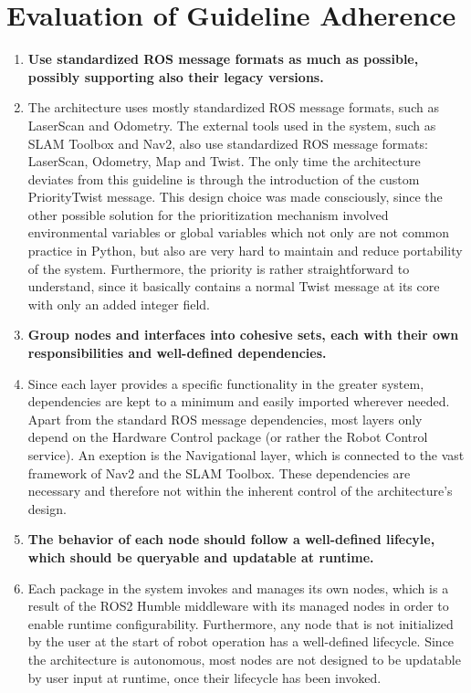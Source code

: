 \documentclass[%
paper=A4,               %
twoside=true,           %
openright,              %
11pt,                   %
bibliography=totoc,     %
titlepage=on,           %
DIV=12,                 %
BCOR=1.5cm,             %
parskip=half,            %
final
]{scrreprt}
\begin{document}
	\section{Evaluation of Guideline Adherence}
	\label{sec:ComparisonMalavolta}
	
	\begin{enumerate}[leftmargin=9mm, align=left]
		\item \textbf{Use standardized ROS message formats as much as possible, possibly supporting also their legacy versions.} 
		\item[]The architecture uses mostly standardized ROS message formats, such as LaserScan and Odometry. The external tools used in the system, such as SLAM Toolbox and Nav2, also use standardized ROS message formats: LaserScan, Odometry, Map and Twist. The only time the architecture deviates from this guideline is through the introduction of the custom PriorityTwist message. This design choice was made consciously, since the other possible solution for the prioritization mechanism involved environmental variables or global variables which not only are not common practice in Python, but also are very hard to maintain and reduce portability of the system. Furthermore, the priority is rather straightforward to understand, since it basically contains a normal Twist message at its core with only an added integer field.
		
		\item \textbf{Group nodes and interfaces into cohesive sets, each with their own responsibilities and well-defined dependencies.} 
		\item[]Since each layer provides a specific functionality in the greater system, dependencies are kept to a minimum and easily imported wherever needed. Apart from the standard ROS message dependencies, most layers only depend on the Hardware Control package (or rather the Robot Control service). An exeption is the Navigational layer, which is connected to the vast framework of Nav2 and the SLAM Toolbox. These dependencies are necessary and therefore not within the inherent control of the architecture's design.
		
		\item \textbf{The behavior of each node should follow a well-defined lifecyle, which should be queryable and updatable at runtime.} 
		\item[]
		Each package in the system invokes and manages its own nodes, which is a result of the ROS2 Humble middleware with its managed nodes in order to enable runtime configurability. Furthermore, any node that is not initialized by the user at the start of robot operation has a well-defined lifecycle. Since the architecture is autonomous, most nodes are not designed to be updatable by user input at runtime, once their lifecycle has been invoked. 
		

\end{enumerate}
\end{document}
